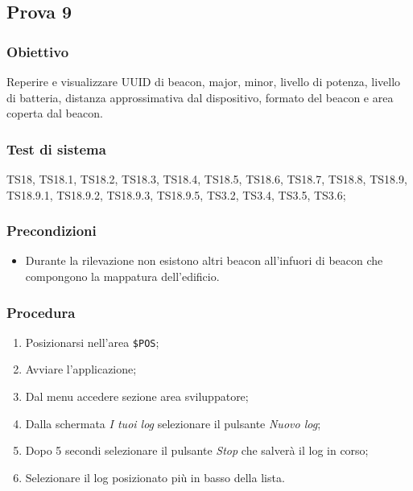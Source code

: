 \documentclass[../Sperimentazione.tex]{subfiles}
\begin{document}
\newpage	
\subsection{Prova 9} %
\label{subsec:Prova9}	
	
	\subsubsection{Obiettivo}
		Reperire e visualizzare UUID di beacon, major, minor, livello di potenza, livello di batteria, distanza approssimativa dal dispositivo, formato del beacon e area coperta dal beacon.
		
	\subsubsection{Test di sistema}
		TS18, TS18.1, TS18.2, TS18.3, TS18.4, TS18.5, TS18.6, TS18.7, TS18.8,
		TS18.9, TS18.9.1, TS18.9.2, TS18.9.3, TS18.9.5,
		TS3.2, TS3.4, TS3.5, TS3.6;
		
	\subsubsection{Precondizioni}
		\begin{itemize}
			\item Durante la rilevazione non esistono altri beacon all'infuori di beacon che compongono la mappatura dell'edificio.
		\end{itemize}				
		
	\subsubsection{Procedura}
		\begin{enumerate}
		\item Posizionarsi nell'area \verb|$POS|;
		\item Avviare l'applicazione;
		\item Dal menu accedere sezione area sviluppatore;
		\item Dalla schermata \textit{I tuoi log} selezionare il pulsante \textit{Nuovo log};
		\item Dopo 5 secondi selezionare il pulsante \textit{Stop}  che salverà il log in corso;
		\item Selezionare il log posizionato più in basso della lista.
		\end{enumerate}
		
\end{document}
